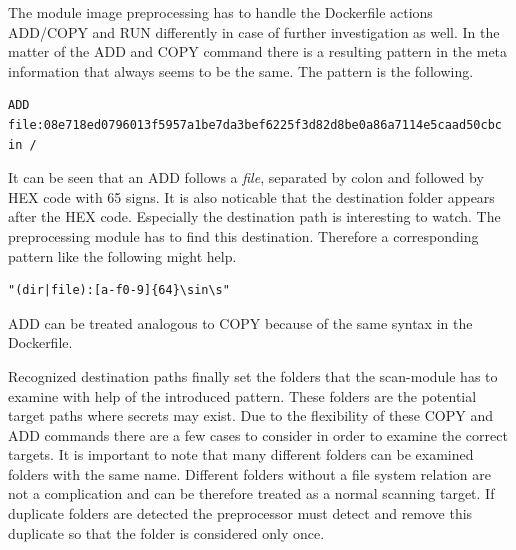 The module image preprocessing has to handle the Dockerfile actions ADD/COPY and RUN differently in case of further investigation as well.
In the matter of the ADD and COPY command there is a resulting pattern in the meta information that always seems to be the same.
The pattern is the following.
\begin{lstlisting}
ADD file:08e718ed0796013f5957a1be7da3bef6225f3d82d8be0a86a7114e5caad50cbc in /
\end{lstlisting}
It can be seen that an ADD follows a \textit{file}, separated by colon and followed by HEX code with 65 signs. 
It is also noticable that the destination folder appears after the HEX code.
Especially the destination path is interesting to watch. 
The preprocessing module has to find this destination. 
Therefore a corresponding pattern like the following might help.
\begin{lstlisting}
"(dir|file):[a-f0-9]{64}\sin\s"
\end{lstlisting}
ADD can be treated analogous to COPY because of the same syntax in the Dockerfile.

Recognized destination paths finally set the folders that the scan-module has to examine with help of the introduced pattern. 
These folders are the potential target paths where secrets may exist.
Due to the flexibility of these COPY and ADD commands there are a few cases to consider in order to examine the correct targets.
It is important to note that many different folders can be examined folders with the same name.
Different folders without a file system relation are not a complication and can be therefore treated as a normal scanning target. 
If duplicate folders are detected the preprocessor must detect and remove this duplicate so that the folder is considered only once.

